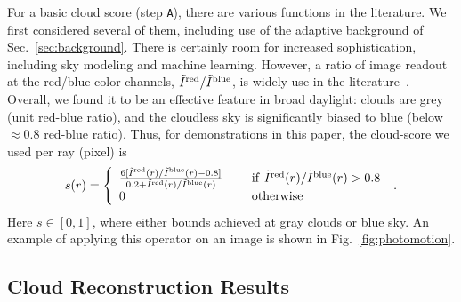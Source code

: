 \documentclass[runningheads]{llncs}
\begin{document}
For a basic cloud score (step {\tt A}), there are various functions in the literature. We first considered several of them, including use of the adaptive background of Sec.~\ref{sec:background}. There is certainly room for increased sophistication, including sky modeling and machine learning. However,
a ratio of image readout at the red/blue color channels, $\tilde I^{\rm red}/\tilde I^{\rm blue}$, is widely use in the literature~\cite{Yamashita2004,Seiz2002}. Overall, we found it to be an effective feature in broad daylight: clouds are grey (unit red-blue ratio), and the cloudless sky is significantly biased to blue
(below $\approx 0.8$ red-blue ratio). Thus, for demonstrations in this paper,
the cloud-score we used per ray (pixel) is
\begin{equation}
 s(r)=\left\{
      \begin{array}{ll}
      \frac{6 [\tilde I^{\rm red}(r)/\tilde I^{\rm blue}(r)-0.8]}
           {0.2+\tilde I^{\rm red}(r)/\tilde I^{\rm blue}(r)}
      & ~~~~{\rm if}~ \tilde I^{\rm red}(r)/\tilde I^{\rm blue}(r)>0.8 \\
      0
      & ~~~~{\rm otherwise}
      \end{array}
      \right.
  \;.
 \label{eq:sr}
\end{equation}
Here $s\in[0,1]$, where either bounds achieved at gray clouds or blue sky. An example of applying this operator on an image is shown in Fig.~\ref{fig:photomotion}.


\subsection*{Cloud Reconstruction Results}
\label{sec:results}
\end{document}
